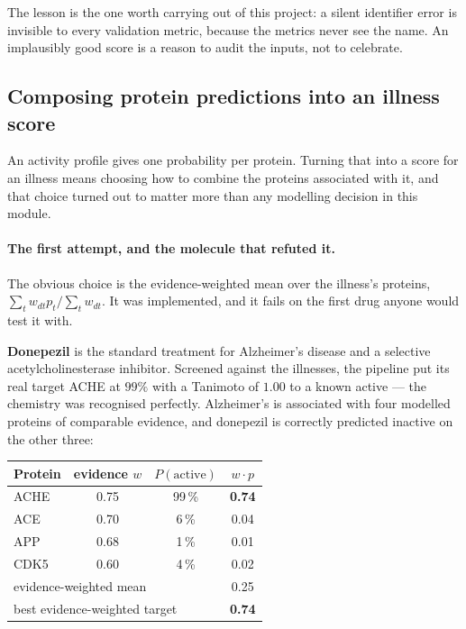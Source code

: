 The lesson is the one worth carrying out of this project: a silent identifier error is invisible
to every validation metric, because the metrics never see the name. An implausibly good score is
a reason to audit the inputs, not to celebrate.

\subsection{Composing protein predictions into an illness score}
\label{sec:illness-score}

An activity profile gives one probability per protein. Turning that into a score for an illness
means choosing how to combine the proteins associated with it, and that choice turned out to
matter more than any modelling decision in this module.

\paragraph{The first attempt, and the molecule that refuted it.} The obvious choice is the
evidence-weighted mean over the illness's proteins,
$\sum_t w_{dt} p_t / \sum_t w_{dt}$. It was implemented, and it fails on the first drug anyone
would test it with.

\textbf{Donepezil} is the standard treatment for Alzheimer's disease and a selective
acetylcholinesterase inhibitor. Screened against the \TgtNDiseases{} illnesses, the pipeline put
its real target ACHE at $99\%$ with a Tanimoto of $1.00$ to a known active --- the chemistry was
recognised perfectly. Alzheimer's is associated with four modelled proteins of comparable
evidence, and donepezil is correctly predicted inactive on the other three:

\begin{center}\small
\begin{tabular}{lccc}
\toprule
Protein & evidence $w$ & $P(\text{active})$ & $w \cdot p$\\
\midrule
ACHE  & 0.75 & 99\,\% & \textbf{0.74}\\
ACE   & 0.70 &  6\,\% & 0.04\\
APP   & 0.68 &  1\,\% & 0.01\\
CDK5  & 0.60 &  4\,\% & 0.02\\
\midrule
\multicolumn{3}{l}{evidence-weighted mean} & 0.25\\
\multicolumn{3}{l}{best evidence-weighted target} & \textbf{0.74}\\
\bottomrule
\end{tabular}
\end{center}

